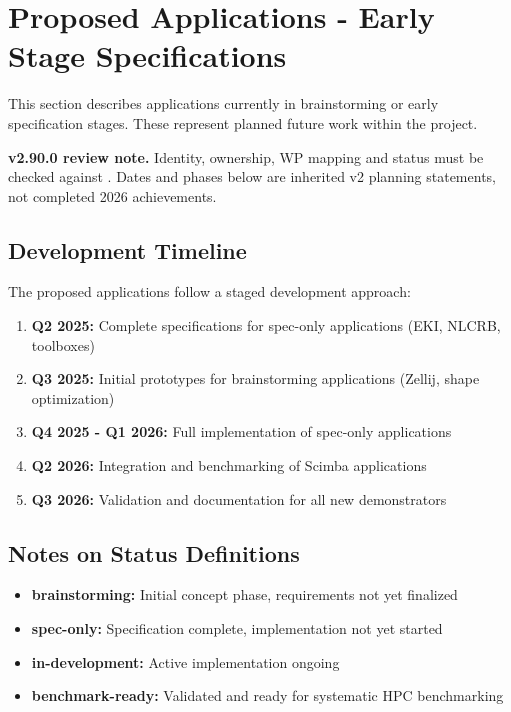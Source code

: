 
\section{Proposed Applications - Early Stage Specifications}
\label{sec:app:specs:proposed}

This section describes applications currently in brainstorming or early specification stages. These represent planned future work within the \exama project.

\noindent\textbf{v2.90.0 review note.} Identity, ownership, WP mapping and status
must be checked against .  Dates and phases
below are inherited v2 planning statements, not completed 2026 achievements.

\subsection{Development Timeline}

The proposed applications follow a staged development approach:

\begin{enumerate}
\item \textbf{Q2 2025:} Complete specifications for spec-only applications (EKI, NLCRB, toolboxes)
\item \textbf{Q3 2025:} Initial prototypes for brainstorming applications (Zellij, shape optimization)
\item \textbf{Q4 2025 - Q1 2026:} Full implementation of spec-only applications
\item \textbf{Q2 2026:} Integration and benchmarking of Scimba applications
\item \textbf{Q3 2026:} Validation and documentation for all new demonstrators
\end{enumerate}

\subsection{Notes on Status Definitions}

\begin{itemize}
\item \textbf{brainstorming:} Initial concept phase, requirements not yet finalized
\item \textbf{spec-only:} Specification complete, implementation not yet started
\item \textbf{in-development:} Active implementation ongoing
\item \textbf{benchmark-ready:} Validated and ready for systematic HPC benchmarking
\end{itemize}
